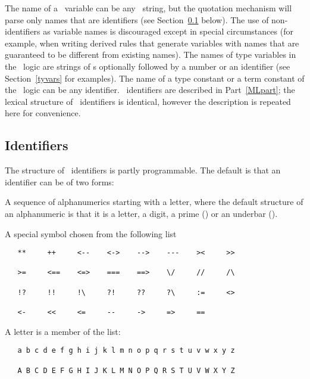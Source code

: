 The name of a \HOL\  variable 
can be any  \ML\ string, but the quotation
mechanism will parse  only names that are  
identifiers (see Section~\ref{ident} below).  
The use of non-identifiers as  variable names  is discouraged except
in special  circumstances  (for example, when  writing  
derived   rules  that  generate
variables with names that are guaranteed to be different from existing names).
The names of type 
variables in the \HOL\ logic are strings
of \ml{*}s optionally followed by a number or an identifier (see
Section~\ref{tyvars} for examples).
The name of a type constant or a term constant of the \HOL\ logic can
be any identifier.  \ML\ identifiers are described in Part~\ref{MLpart}; the 
lexical structure of \HOL\ identifiers is identical, however the
description is repeated here for convenience. 

\subsection{Identifiers}
\label{ident}

The structure of \HOL\ identifiers is partly programmable. The default
is that an identifier can be of two forms:
\begin{myenumerate}
\item A sequence of alphanumerics starting with a letter, 
where the default structure of an alphanumeric is that it is a letter, 
a digit, a prime () or an underbar (\ty{\_}).
\item A special symbol chosen from the following list

{\small \begin{verbatim}
   **     ++     <--    <->    -->    ---    ><     >>

   >=     <==    <=>    ===    ==>    \/     //     /\

   !?     !!     !\     ?!     ??     ?\     :=     <>

   <-     <<     <=     --     ->     =>     ==
\end{verbatim}}

\end{myenumerate}

\noindent A letter is a member of the list:


\begin{hol}\begin{verbatim}
   a b c d e f g h i j k l m n o p q r s t u v w x y z

   A B C D E F G H I J K L M N O P Q R S T U V W X Y Z
\end{verbatim}\end{hol}

